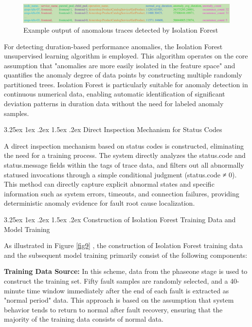 \documentclass[10pt]{article}
\makeatletter
\let\oldref\ref
\renewcommand{\ref}[1]{%
    \textcolor{blue}{\oldref{#1}}%
}
\renewcommand{\paragraph}{%
    \@startsection{paragraph}{4}{\z@}%
    {3.25ex \@plus1ex \@minus.2ex}%
    {1.5ex \@plus.2ex}%
    {\normalfont\normalsize\itshape}%
}
\makeatother
\begin{document}
\begin{figure}[htbp]
    \centering
    \includegraphics[width=1.0\textwidth]{pics/fig10.pdf}
    \caption{Example output of anomalous traces detected by Isolation Forest}
    \label{fig10}
\end{figure}

For detecting duration-based performance anomalies, the Isolation Forest unsupervised learning algorithm is employed. This algorithm operates on the core assumption that "anomalies are more easily isolated in the feature space" and quantifies the anomaly degree of data points by constructing multiple randomly partitioned trees. Isolation Forest is particularly suitable for anomaly detection in continuous numerical data, enabling automatic identification of significant deviation patterns in duration data without the need for labeled anomaly samples.

\paragraph{Direct Inspection Mechanism for Status Codes}

A direct inspection mechanism based on status codes is constructed, eliminating the need for a training process. The system directly analyzes the status.code and status.message fields within the tags of trace data, and filters out all abnormally statused invocations through a simple conditional judgment (status.code ≠ 0). This method can directly capture explicit abnormal states and specific information such as system errors, timeouts, and connection failures, providing deterministic anomaly evidence for fault root cause localization.

\paragraph{Construction of Isolation Forest Training Data and Model Training}

As illustrated in Figure \ref{fig9}, the construction of Isolation Forest training data and the subsequent model training primarily consist of the following components:

\textbf{Training Data Source:} In this scheme, data from the phaseone stage is used to construct the training set. Fifty fault samples are randomly selected, and a 40-minute time window immediately after the end of each fault is extracted as "normal period" data. This approach is based on the assumption that system behavior tends to return to normal after fault recovery, ensuring that the majority of the training data consists of normal data.
\end{document}
